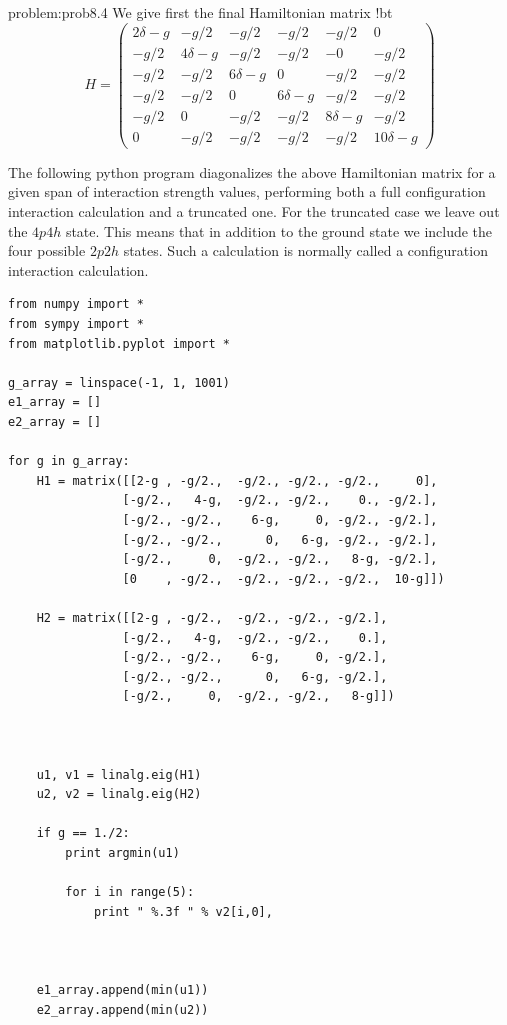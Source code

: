 \begin{sol}{problem:prob8.4}
We give first the final Hamiltonian matrix
!bt
\[
H = \left (
\begin{array}{cccccc}
2\delta -g & -g/2 & -g/2 & -g/2 & -g/2 & 0 \\
 -g/2 & 4\delta -g & -g/2 & -g/2 & -0 & -g/2 \\
-g/2 & -g/2 & 6\delta -g & 0 & -g/2 & -g/2 \\
 -g/2 & -g/2 & 0 & 6\delta-g & -g/2 & -g/2 \\
 -g/2 & 0 & -g/2 & -g/2 & 8\delta-g & -g/2 \\
0 & -g/2 & -g/2 & -g/2 & -g/2 & 10\delta -g
\end{array} \right )
\]

The following python program diagonalizes the above Hamiltonian matrix for a given span of interaction strength values, performing both a full configuration interaction calculation and a truncated one. For the truncated case we leave out the $4p4h$ state. This means that in addition to the ground state we include the four possible $2p2h$ states. Such a calculation is normally called a configuration interaction calculation.
\begin{lstlisting}
from numpy import *
from sympy import *
from matplotlib.pyplot import *

g_array = linspace(-1, 1, 1001)
e1_array = []
e2_array = []

for g in g_array:
	H1 = matrix([[2-g , -g/2.,  -g/2., -g/2., -g/2.,     0],
		        [-g/2.,   4-g,  -g/2., -g/2.,    0., -g/2.],
		        [-g/2., -g/2.,    6-g,     0, -g/2., -g/2.],
				[-g/2., -g/2.,      0,   6-g, -g/2., -g/2.],
				[-g/2.,     0,  -g/2., -g/2.,   8-g, -g/2.],
				[0    , -g/2.,  -g/2., -g/2., -g/2.,  10-g]])

	H2 = matrix([[2-g , -g/2.,  -g/2., -g/2., -g/2.],
		        [-g/2.,   4-g,  -g/2., -g/2.,    0.],
		        [-g/2., -g/2.,    6-g,     0, -g/2.],
				[-g/2., -g/2.,      0,   6-g, -g/2.],
				[-g/2.,     0,  -g/2., -g/2.,   8-g]])



	u1, v1 = linalg.eig(H1)
	u2, v2 = linalg.eig(H2)

	if g == 1./2:
		print argmin(u1)

		for i in range(5):
			print " %.3f " % v2[i,0],



	e1_array.append(min(u1))
	e2_array.append(min(u2))



\end{lstlisting}
\end{sol}

